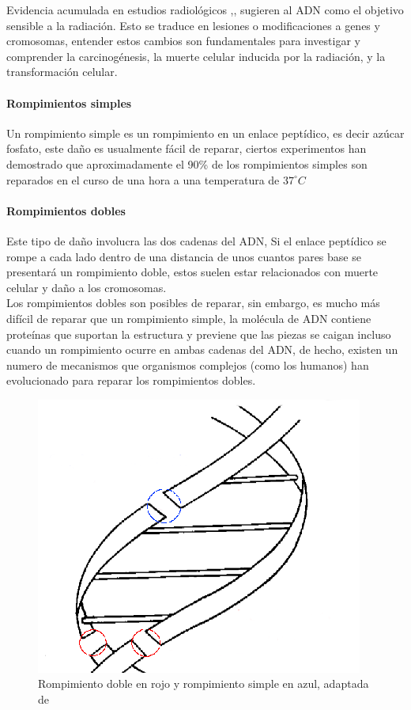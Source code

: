 Evidencia acumulada en estudios radiológicos \cite{Franklin},\cite{rescells},  sugieren al ADN como el  objetivo sensible a la radiación. Esto se traduce en lesiones o modificaciones a genes y cromosomas, entender estos cambios son fundamentales para investigar y comprender la carcinogénesis, la muerte celular inducida por la radiación, y la transformación celular.\\


\paragraph{Rompimientos simples}
Un rompimiento simple es un rompimiento en un enlace peptídico, es decir azúcar fosfato, este daño es usualmente fácil de reparar, ciertos experimentos han demostrado que aproximadamente el 90\% de los rompimientos simples son reparados en el curso de una hora a una temperatura de $37^{\circ} C$ \cite{Thormod}

\paragraph{Rompimientos dobles}

Este tipo de daño involucra las dos cadenas del ADN, Si el enlace peptídico se rompe a cada lado dentro de una distancia de unos cuantos pares base se presentará un rompimiento doble, estos suelen estar relacionados con muerte celular y daño a los cromosomas.\\
Los rompimientos dobles son posibles de reparar, sin embargo, es mucho más difícil de reparar que un rompimiento simple, la molécula de ADN contiene proteínas que suportan la estructura y previene que las piezas se caigan incluso cuando un rompimiento ocurre en ambas cadenas del ADN, de hecho, existen un numero de mecanismos que organismos complejos (como los humanos) han evolucionado para reparar los rompimientos dobles\cite{Thormod}.

\begin{figure}[htbp]
    \centering
    \includegraphics[width=0.5\linewidth]{./Figures/esbdb.png}
    \caption[Esquema rompimientos simples y dobles]{Rompimiento doble en rojo y rompimiento simple en azul, adaptada de \cite{Thormod}}
    \label{fig:esbdb}
\end{figure}


